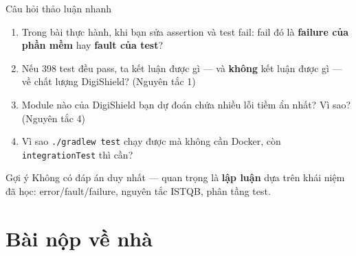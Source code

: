 \documentclass[aspectratio=169,12pt]{beamer}
\begin{document}
\begin{frame}{Câu hỏi thảo luận nhanh}
  \begin{enumerate}
    \item Trong bài thực hành, khi bạn sửa assertion và test fail:
          fail đó là \textbf{failure của phần mềm} hay \textbf{fault của test}?
    \item Nếu 398 test đều pass, ta kết luận được gì --- và
          \textbf{không} kết luận được gì --- về chất lượng DigiShield?
          (Nguyên tắc 1)
    \item Module nào của DigiShield bạn dự đoán chứa nhiều lỗi tiềm ẩn nhất?
          Vì sao? (Nguyên tắc 4)
    \item Vì sao \texttt{./gradlew test} chạy được mà không cần Docker,
          còn \texttt{integrationTest} thì cần?
  \end{enumerate}

  \vspace{0.4em}
  \begin{exampleblock}{Gợi ý}
    Không có đáp án duy nhất --- quan trọng là \textbf{lập luận} dựa trên
    khái niệm đã học: error/fault/failure, nguyên tắc ISTQB, phân tầng test.
  \end{exampleblock}
\end{frame}

\section{Bài nộp về nhà}
\end{document}
